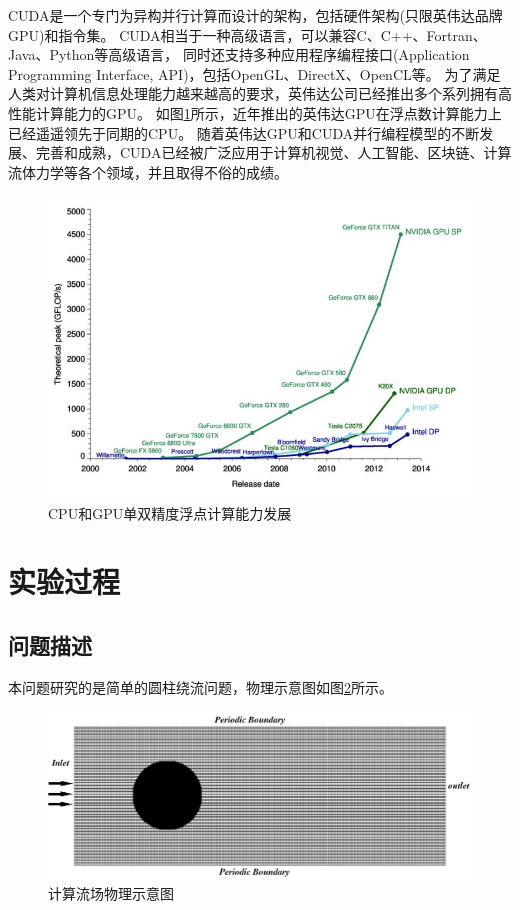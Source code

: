 \documentclass[UTF8]{ctexart}
\begin{document}
        CUDA是一个专门为异构并行计算而设计的架构，包括硬件架构(只限英伟达品牌GPU)和指令集。
        CUDA相当于一种高级语言，可以兼容C、C++、Fortran、Java、Python等高级语言，
        同时还支持多种应用程序编程接口(Application Programming Interface, API)，包括OpenGL、DirectX、OpenCL等。
        为了满足人类对计算机信息处理能力越来越高的要求，英伟达公司已经推出多个系列拥有高性能计算能力的GPU。
        如图\ref{fig:curve}所示，近年推出的英伟达GPU在浮点数计算能力上已经遥遥领先于同期的CPU。
        随着英伟达GPU和CUDA并行编程模型的不断发展、完善和成熟，CUDA已经被广泛应用于计算机视觉、人工智能、区块链、计算流体力学等各个领域，并且取得不俗的成绩。

        \begin{figure}[H]
            \centering
            \includegraphics[scale=0.5]{./figures/curve.jpg}
            \caption{\textup{\heiti CPU和GPU单双精度浮点计算能力发展} }
            \label{fig:curve}
        \end{figure}

    \section{实验过程}
        \subsection{问题描述}
        本问题研究的是简单的圆柱绕流问题，物理示意图如图\ref{fig:model}所示。
        \begin{figure}[H]
            \centering
            \includegraphics[scale=0.4]{./figures/model.png}
            \caption{\textup{\heiti 计算流场物理示意图} }
            \label{fig:model}
        \end{figure}
\end{document}
